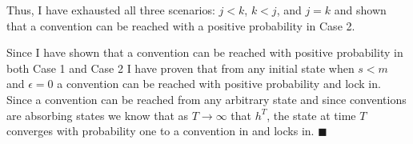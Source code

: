 \documentclass{article}
\begin{document}
\vskip12pt

Thus, I have exhausted all three scenarios: $j<k$, $k<j$, and $j=k$ and shown that a convention can be reached with a positive probability in Case 2.

\vskip12pt

Since I have shown that a convention can be reached with positive probability in both Case 1 and Case 2 I have proven that from any initial state when $s<m$ and $\epsilon=0$ a convention can be reached with positive probability and lock in. Since a convention can be reached from any arbitrary state and since conventions are absorbing states we know that as $T \rightarrow \infty$ that $h^T$, the state at time $T$ converges with probability one to a convention in and locks in. $\blacksquare$
\end{document}
